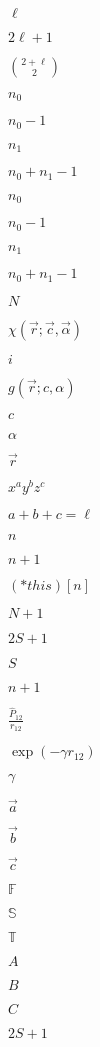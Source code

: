 \documentclass{article}
\begin{document}
$\ell$
\pagebreak

$2\ell + 1$
\pagebreak

$\binom{2 + \ell}{2}$
\pagebreak

$n_0$
\pagebreak

$n_0 -1$
\pagebreak

$n_1$
\pagebreak

$n_0 + n_1 - 1$
\pagebreak

$n_{0}$
\pagebreak

$n_{0} -1$
\pagebreak

$n_{1}$
\pagebreak

$n_0 + n_1 -1$
\pagebreak

$N$
\pagebreak

$\chi(\vec{r};\vec{c}, \vec{\alpha})$
\pagebreak

$i$
\pagebreak

$g(\vec{r};c, \alpha)$
\pagebreak

$c$
\pagebreak

$\alpha$
\pagebreak

$\vec{r}$
\pagebreak

$x^ay^bz^c$
\pagebreak

$a+b+c = \ell$
\pagebreak

$n$
\pagebreak

$n + 1$
\pagebreak

$(*this)[n]$
\pagebreak

$N+1$
\pagebreak

$2S+1$
\pagebreak

$S$
\pagebreak

$n + 1 $
\pagebreak

$\frac{\widehat{P}_{12}}{r_{12}}$
\pagebreak

$\exp(-\gamma r_{12})$
\pagebreak

$\gamma$
\pagebreak

$\vec{a}$
\pagebreak

$\vec{b}$
\pagebreak

$\vec{c}$
\pagebreak

$\mathbb{F}$
\pagebreak

$\mathbb{S}$
\pagebreak

$\mathbb{T}$
\pagebreak

$A$
\pagebreak

$B$
\pagebreak

$C$
\pagebreak

$2S + 1$
\pagebreak
\end{document}
